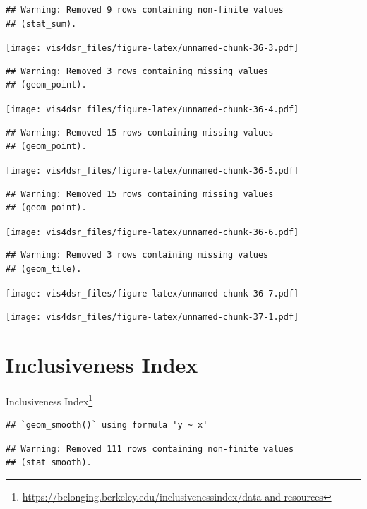\documentclass[
]{krantz}
\renewcommand{\href}[2]{#2\footnote{\url{#1}}}
\begin{document}
\begin{verbatim}
## Warning: Removed 9 rows containing non-finite values
## (stat_sum).
\end{verbatim}

\texttt{[image: vis4dsr\_files/figure-latex/unnamed-chunk-36-3.pdf]}

\begin{verbatim}
## Warning: Removed 3 rows containing missing values
## (geom_point).
\end{verbatim}

\texttt{[image: vis4dsr\_files/figure-latex/unnamed-chunk-36-4.pdf]}

\begin{verbatim}
## Warning: Removed 15 rows containing missing values
## (geom_point).
\end{verbatim}

\texttt{[image: vis4dsr\_files/figure-latex/unnamed-chunk-36-5.pdf]}

\begin{verbatim}
## Warning: Removed 15 rows containing missing values
## (geom_point).
\end{verbatim}

\texttt{[image: vis4dsr\_files/figure-latex/unnamed-chunk-36-6.pdf]}

\begin{verbatim}
## Warning: Removed 3 rows containing missing values
## (geom_tile).
\end{verbatim}

\texttt{[image: vis4dsr\_files/figure-latex/unnamed-chunk-36-7.pdf]}

\texttt{[image: vis4dsr\_files/figure-latex/unnamed-chunk-37-1.pdf]}

\hypertarget{inclusiveness-index}{%
\section*{Inclusiveness Index}\label{inclusiveness-index}}


\href{https://belonging.berkeley.edu/inclusivenessindex/data-and-resources}{Inclusiveness Index}

\begin{verbatim}
## `geom_smooth()` using formula 'y ~ x'
\end{verbatim}

\begin{verbatim}
## Warning: Removed 111 rows containing non-finite values
## (stat_smooth).
\end{verbatim}
\end{document}
